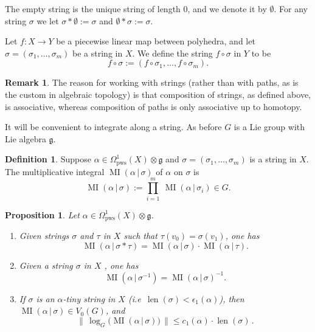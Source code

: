 \documentclass[10pt, a4paper]{amsart}
\newtheorem{prop}[equation]{Proposition}
\theoremstyle{definition}
\newtheorem{dfn}[equation]{Definition}
\newtheorem{rem}[equation]{Remark}
\numberwithin{equation}{section}
\newcommand{\opn}{\operatorname}
\newcommand{\mfrak}[1]{\mathfrak{#1}}
\newcommand{\mrm}[1]{\mathrm{#1}}
\newcommand{\tup}[1]{\textup{#1}}
\newcommand{\Norm}[1]{\bigl\lVert\, #1 \, \bigr\rVert}
\renewcommand{\vert}{\, | \,}
\newcommand{\g}{\mfrak{g}}
\begin{document}
The empty string is the unique string of length $0$, and we denote it by
$\emptyset$. For any string $\sigma$ we let
$\sigma * \emptyset := \sigma$ and 
$\emptyset * \sigma := \sigma$.

Let $f : X \to Y$ be a piecewise linear map between polyhedra, and let
$\sigma = (\sigma_1, \ldots, \sigma_m)$ be a string in $X$.
We define the string $f \circ \sigma$ in
$Y$ to be
\begin{equation} \label{eqn14}
f \circ \sigma := (f \circ \sigma_1, \ldots, f \circ \sigma_m) .
\end{equation}

\begin{rem}
The reason for working with strings (rather than with paths, as is the custom
in algebraic topology) is that composition of strings, as defined above, is
associative, whereas composition of paths is only associative up to homotopy.
\end{rem}

It will be convenient to integrate along a string. 
As before $G$ is a Lie group with Lie algebra $\g$.

\begin{dfn} \label{dfn:10}
Suppose $\alpha \in \Omega^1_{\mrm{pws}}(X) \otimes \mfrak{g}$
and 
$\sigma = (\sigma_1, \ldots, \sigma_m)$
is a string in $X$. The multiplicative integral 
$\opn{MI}(\alpha \vert \sigma)$ of $\alpha$ on $\sigma$ is 
\[ \opn{MI}(\alpha \vert \sigma) :=
\prod_{i=1}^m\ \opn{MI}(\alpha \vert \sigma_i) \in G . \]
\end{dfn}

\begin{prop} \label{prop:1}
Let 
$\alpha \in \Omega_{\mrm{pws}}^1(X) \otimes \mfrak{g}$.
\begin{enumerate}
\item Given strings $\sigma$ and $\tau$ in $X$ such that
$\tau(v_0) = \sigma(v_1)$, one has
\[ \opn{MI}(\alpha \vert \sigma * \tau) = 
\opn{MI}(\alpha \vert \sigma) \cdot \opn{MI}(\alpha \vert \tau) . \]

\item Given a string $\sigma$ in $X$ , one has
\[ \opn{MI}(\alpha \vert \sigma^{-1}) = 
\opn{MI}(\alpha \vert \sigma)^{-1} . \]

\item If $\sigma$ is an $\alpha$-tiny string in $X$ 
\tup{(}i.e\ 
$\opn{len}(\sigma) < \epsilon_1(\alpha)$\tup{)}, then 
$\opn{MI}(\alpha \vert \sigma) \in V_0(G)$, and 
\[ \Norm{ \opn{log}_G \bigl( \opn{MI}(\alpha \vert \sigma) \bigr) }
\leq c_1(\alpha) \cdot \opn{len}(\sigma) \, . \]
\end{enumerate}
\end{prop}
\end{document}
